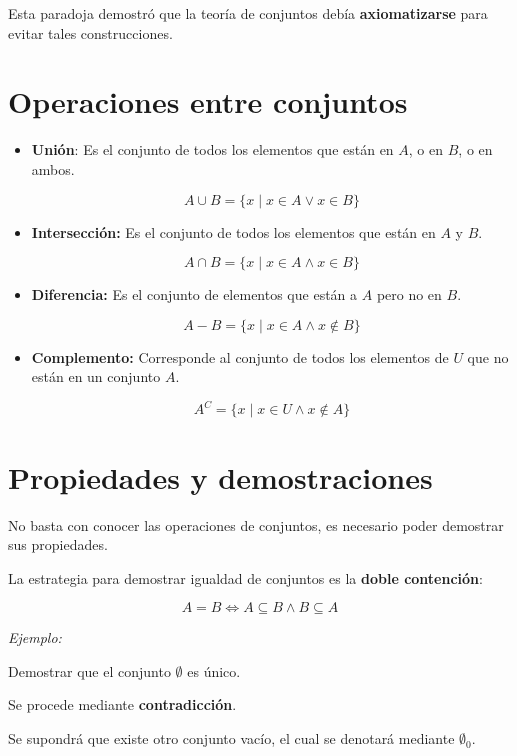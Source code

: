 \documentclass{article}
\begin{document}
Esta paradoja demostró que la teoría de conjuntos debía \textbf{axiomatizarse} para evitar tales construcciones. 

\section{Operaciones entre conjuntos}

\begin{itemize}
    \item \textbf{Unión}: Es el conjunto de todos los elementos que están en $A$, o en $B$, o en ambos.
    
    \[ A \cup B = \{x \mid x \in A \lor x \in B \} \]    
    
    \item \textbf{Intersección:} Es el conjunto de todos los elementos que están en $A$ y $B$.
    
    \[ A \cap B = \{x \mid x \in A \land x \in B  \}  \]

    \item \textbf{Diferencia:} Es el conjunto de elementos que están a $A$ pero no en $B$.
    
    \[ A - B = \{x \mid x \in A \land x \notin B  \} \]
    
    \item \textbf{Complemento:} Corresponde al conjunto de todos los elementos de $U$ que no están en un conjunto $A$.
    
    \[ A^C = \{x \mid x \in U \land x \notin A  \}  \]
\end{itemize}

\section{Propiedades y demostraciones}

No basta con conocer las operaciones de conjuntos, es necesario poder demostrar sus propiedades.

La estrategia para demostrar igualdad de conjuntos es la \textbf{doble contención}:

\[ A = B \iff  A \subseteq B \land B \subseteq A \]

\textit{Ejemplo:}

Demostrar que el conjunto $\emptyset$ es único.

Se procede mediante \textbf{contradicción}.

Se supondrá que existe otro conjunto vacío, el cual se denotará mediante $\emptyset_0$.
\end{document}
